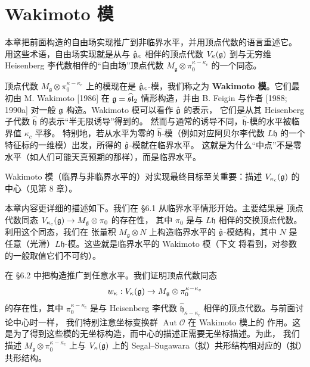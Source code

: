 %
%
\begingroup

\chapter{Wakimoto 模}

本章把前面构造的自由场实现推广到非临界水平，并用顶点代数的语言重述它。
用这些术语，自由场实现就是从与 $\hat{\mathfrak{g}}_\kappa$ 相伴的顶点代数
$V_\kappa(\mathfrak{g})$ 到与无穷维 Heisenberg 李代数相伴的“自由场”顶点代数
$M_{\mathfrak g}\otimes\pi_0^{\kappa-\kappa_c}$ 的一个同态。

顶点代数 $M_{\mathfrak g}\otimes\pi_0^{\kappa-\kappa_c}$ 上的模现在是
$\hat{\mathfrak{g}}_\kappa$-模，我们称之为 \textbf{Wakimoto 模}。它们最初由 M. Wakimoto
[1986] 在 $\mathfrak{g}=\widehat{\mathfrak{sl}}_2$ 情形构造，并由 B. Feigin 与作者
[1988; 1990a] 对一般 $\mathfrak{g}$ 构造。Wakimoto 模可以看作 $\hat{\mathfrak{g}}$ 的表示，
它们是从其 Heisenberg 子代数 $\widehat{\mathfrak h}$ 的表示“半无限诱导”得到的。
然而与通常的诱导不同，$\widehat{\mathfrak h}$-模的水平被临界值 $\kappa_c$ 平移。
特别地，若从水平为零的 $\widehat{\mathfrak h}$-模（例如对应阿贝尔李代数
$L\mathfrak h$ 的一个特征标的一维模）出发，所得的 $\hat{\mathfrak{g}}$-模就在临界水平。
这就是为什么“中点”不是零水平（如人们可能天真预期的那样），而是临界水平。

Wakimoto 模（临界与非临界水平的）对实现最终目标至关重要：描述
$V_{\kappa_c}(\mathfrak{g})$ 的中心（见第 8 章）。

本章内容更详细的描述如下。我们在 \S6.1 从临界水平情形开始。主要结果是
顶点代数同态 $V_{\kappa_c}(\mathfrak{g})\to M_{\mathfrak g}\otimes\pi_0$ 的存在性，
其中 $\pi_0$ 是与 $L\mathfrak h$ 相伴的交换顶点代数。利用这个同态，我们在
张量积 $M_{\mathfrak g}\otimes N$ 上构造临界水平的 $\hat{\mathfrak{g}}$-模结构，其中
$N$ 是任意（光滑）$L\mathfrak h$-模。这些就是临界水平的 Wakimoto 模（下文
将看到，对参数的一般取值它们不可约）。

在 \S6.2 中把构造推广到任意水平。我们证明顶点代数同态
\[
    w_\kappa:V_\kappa(\mathfrak{g})\to M_{\mathfrak g}\otimes\pi_0^{\kappa-\kappa_c}
\]
的存在性，其中 $\pi_0^{\kappa-\kappa_c}$ 是与 Heisenberg 李代数
$\widehat{\mathfrak h}_{\kappa-\kappa_c}$ 相伴的顶点代数。与前面讨论中心时一样，
我们特别注意坐标变换群 $\operatorname{Aut}\mathcal O$ 在 Wakimoto 模上的
作用。这是为了得到这些模的无坐标构造，而中心的描述正需要无坐标描述。为此，
我们描述 $M_{\mathfrak g}\otimes\pi_0^{\kappa-\kappa_c}$ 上与
$V_\kappa(\mathfrak{g})$ 上的 Segal--Sugawara（拟）共形结构相对应的（拟）共形结构。

